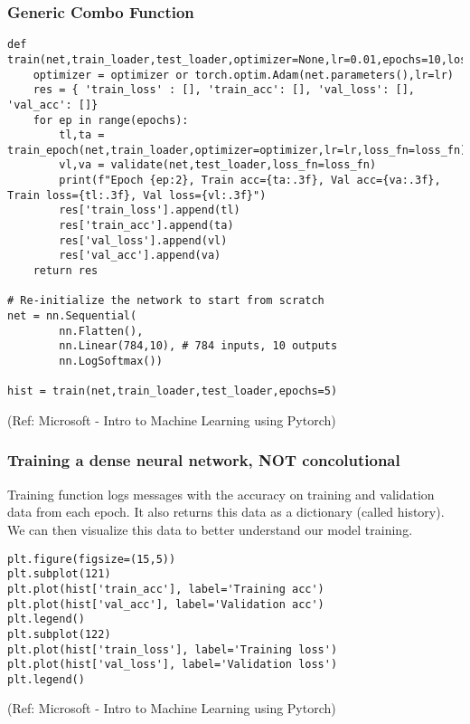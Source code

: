 \begin{frame}[fragile] \frametitle{Generic Combo Function}

\begin{lstlisting}
def train(net,train_loader,test_loader,optimizer=None,lr=0.01,epochs=10,loss_fn=nn.NLLLoss()):
    optimizer = optimizer or torch.optim.Adam(net.parameters(),lr=lr)
    res = { 'train_loss' : [], 'train_acc': [], 'val_loss': [], 'val_acc': []}
    for ep in range(epochs):
        tl,ta = train_epoch(net,train_loader,optimizer=optimizer,lr=lr,loss_fn=loss_fn)
        vl,va = validate(net,test_loader,loss_fn=loss_fn)
        print(f"Epoch {ep:2}, Train acc={ta:.3f}, Val acc={va:.3f}, Train loss={tl:.3f}, Val loss={vl:.3f}")
        res['train_loss'].append(tl)
        res['train_acc'].append(ta)
        res['val_loss'].append(vl)
        res['val_acc'].append(va)
    return res

# Re-initialize the network to start from scratch
net = nn.Sequential(
        nn.Flatten(), 
        nn.Linear(784,10), # 784 inputs, 10 outputs
        nn.LogSoftmax())

hist = train(net,train_loader,test_loader,epochs=5)		
\end{lstlisting}


\tiny{(Ref: Microsoft - Intro to Machine Learning using Pytorch)}
\end{frame}

\begin{frame}[fragile] \frametitle{Training a dense neural network, NOT concolutional}

Training function logs messages with the accuracy on training and validation data from each epoch. It also returns this data as a dictionary (called history). We can then visualize this data to better understand our model training.

\begin{lstlisting}
plt.figure(figsize=(15,5))
plt.subplot(121)
plt.plot(hist['train_acc'], label='Training acc')
plt.plot(hist['val_acc'], label='Validation acc')
plt.legend()
plt.subplot(122)
plt.plot(hist['train_loss'], label='Training loss')
plt.plot(hist['val_loss'], label='Validation loss')
plt.legend()
\end{lstlisting}


\tiny{(Ref: Microsoft - Intro to Machine Learning using Pytorch)}
\end{frame}


